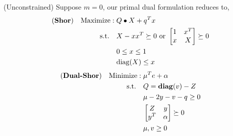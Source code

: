 \documentclass[../main]{subfiles}
\begin{document}
\begin{lemma}
    (Unconstrained) Suppose \(m = 0\), our primal dual formulation reduces to,
    \begin{equation}
        \begin{aligned}
            (\textbf{Shor}) \quad\mathrm{Maximize:\;} & Q\bullet X   + q^T x                                             \\
            \mathrm{s.t.}  \quad       & X-xx^T \succeq 0 \text { or }\begin{bmatrix} 1 & x^{T} \\ x & X \end{bmatrix} \succeq 0 \\
                                       & 0\le x\le 1                                                      \\
                                       & \mathrm{diag}(X) \le x
        \end{aligned}
    \end{equation}
    \begin{equation}
        \begin{aligned}
            (\textbf{Dual-Shor}) \quad \mathrm{Minimize:\;} & \mu^Te + \alpha                     \\
            \mathrm{s.t.} \quad              & Q = \mathbf{diag}(v)  -Z                    \\
                                             & \mu - 2 y - v - q \ge 0             \\
                                             & \begin{bmatrix}Z & y \\ y^T & \alpha\end{bmatrix} \succeq 0 \\
                                             & \mu, v \ge 0
        \end{aligned}
    \end{equation}
\end{lemma}



\end{document}
